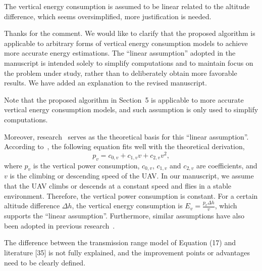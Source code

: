 \begin{revcomment}
	The vertical energy consumption is assumed to be linear related to the altitude difference, which seems oversimplified, more justification is needed.
\end{revcomment}
\begin{revresponse}
	Thanks for the comment.
	We would like to clarify that the proposed algorithm is applicable to arbitrary forms of vertical energy consumption models to achieve more accurate energy estimations.
	The ``linear assumption'' adopted in the manuscript is intended solely to simplify computations and to maintain focus on the problem under study, rather than to deliberately obtain more favorable results.
	We have added an explanation to the revised manuscript.

	\begin{changes}
		Note that the proposed algorithm in Section~5 is applicable to more accurate vertical energy consumption models, and such assumption is only used to simplify computations.
	\end{changes}

	Moreover, research~\cite{vertical-assumption} serves as the theoretical basis for this ``linear assumption''.
	According to~\cite{vertical-assumption}, the following equation fits well with the theoretical derivation,
	\begin{equation}
		p_v = c_{0,v} + c_{1,v}v + c_{2,v}v^2,
	\end{equation}
	where $p_v$ is the vertical power consumption, $c_{0,v}$, $c_{1,v}$ and $c_{2,v}$ are coefficients, and $v$ is the climbing or descending speed of the UAV.
	In our manuscript, we assume that the UAV climbs or descends at a constant speed and flies in a stable environment.
	Therefore, the vertical power consumption is constant.
	For a certain altitude difference $\Delta h$, the vertical energy consumption is $E_v=\frac{p_v\Delta h}{v}$, which supports the ``linear assumption''.
	Furthermore, similar assumptions have also been adopted in previous research~\cite{mgh}.
\end{revresponse}

\begin{revcomment}
	The difference between the transmission range model of Equation (17) and literature [35] is not fully explained, and the improvement points or advantages need to be clearly defined.
\end{revcomment}
\begin{revresponse}
	
\end{revresponse}

